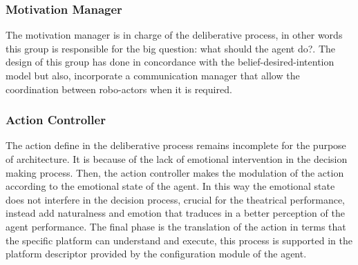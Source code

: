 \subsubsection{Motivation Manager}

The motivation manager is in charge of the deliberative process, in other words  this group is responsible for the big question: what should the agent do?. The design of this group has done in concordance with the belief-desired-intention model but also, incorporate a communication manager that allow the coordination between robo-actors when it is required.

\subsubsection{Action Controller}

The action define in the deliberative process remains incomplete for the purpose of architecture. It is because of the lack of emotional intervention in the decision making process. Then, the action controller makes the modulation of the action according to the emotional state of the agent. In this way the emotional state does not interfere in the decision process, crucial for the theatrical performance, instead add naturalness and emotion that traduces in a better perception of the agent performance. The final phase is the translation of the action in terms that the specific platform can understand and execute, this process is supported in the platform descriptor provided by the configuration module of the agent.